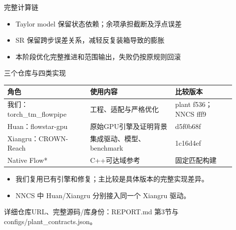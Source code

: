 \documentclass[UTF8,fontset=fandol,aspectratio=169,10pt]{ctexbeamer}
\begin{document}
\begin{frame}{完整计算链}
\begin{center}
\end{center}
\vspace{0.4cm}
\begin{itemize}
\item Taylor model 保留状态依赖；余项承担截断及浮点误差
\item SR 保留跨步误差关系，减轻反复装箱导致的膨胀
\item 本阶段优化完整推进和范围输出，失败仍按原规则回滚
\end{itemize}
\end{frame}
\begin{frame}{三个仓库与四类实现}
{\fontsize{8.5}{11}\selectfont
{\setlength{\tabcolsep}{2pt}\renewcommand{\arraystretch}{1.25}
\begin{tabular}{>{\raggedright\arraybackslash}p{0.331\linewidth}>{\raggedright\arraybackslash}p{0.340\linewidth}>{\raggedright\arraybackslash}p{0.248\linewidth}}
\toprule
\textbf{角色} & \textbf{使用内容} & \textbf{比较版本} \\
\midrule
我们：torch\_\allowbreak{}tm\_\allowbreak{}flowpipe & 工程、适配与严格优化 & plant f536；NNCS fff9 \\
Huan：flowstar-gpu & 原始GPU引擎及证明背景 & d5f0b68f \\
Xiangru：CROWN-Reach & 集成驱动、模型、benchmark & 1c16d4ef \\
Native Flow* & C++可达域参考 & 固定匹配构建 \\
\bottomrule
\end{tabular}
}
}\par
\begin{itemize}
\item 我们复用已有引擎和修复；主比较是具体版本的完整实现差异。
\item NNCS 中 Huan/\allowbreak{}Xiangru 分别接入同一个 Xiangru 驱动。
\end{itemize}\par\vfill{\fontsize{6.5}{8}\selectfont\color{gray}详细仓库URL、完整源码/\allowbreak{}库身份：REPORT.md 第3节与 configs/\allowbreak{}plant\_\allowbreak{}contracts.json。} 
\end{frame}
\end{document}
